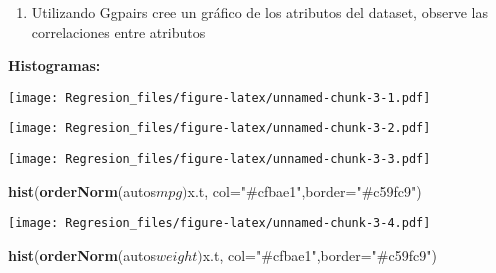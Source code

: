 \documentclass[]{article}
\newenvironment{Shaded}{\begin{snugshade}}{\end{snugshade}}
\newcommand{\KeywordTok}[1]{\textcolor[rgb]{0.13,0.29,0.53}{\textbf{{#1}}}}
\newcommand{\DataTypeTok}[1]{\textcolor[rgb]{0.13,0.29,0.53}{{#1}}}
\newcommand{\StringTok}[1]{\textcolor[rgb]{0.31,0.60,0.02}{{#1}}}
\newcommand{\NormalTok}[1]{{#1}}
\providecommand{\tightlist}{%
  \setlength{\itemsep}{0pt}\setlength{\parskip}{0pt}}
\begin{document}
\begin{enumerate}
\def\labelenumi{\arabic{enumi}.}
\setcounter{enumi}{1}
\tightlist
\item
  Utilizando Ggpairs cree un gráfico de los atributos del dataset,
  observe las correlaciones entre atributos
\end{enumerate}

 \textbf{Histogramas:}

\begin{Shaded}
\end{Shaded}

\texttt{[image: Regresion\_files/figure-latex/unnamed-chunk-3-1.pdf]}

\begin{Shaded}
\end{Shaded}

\texttt{[image: Regresion\_files/figure-latex/unnamed-chunk-3-2.pdf]}

\begin{Shaded}
\end{Shaded}

\texttt{[image: Regresion\_files/figure-latex/unnamed-chunk-3-3.pdf]}

\begin{Shaded}
\begin{Highlighting}[]
\KeywordTok{hist}\NormalTok{(}\KeywordTok{orderNorm}\NormalTok{(autos$mpg)$x.t, }\DataTypeTok{col=}\StringTok{"#cfbae1"}\NormalTok{,}\DataTypeTok{border=}\StringTok{"#c59fc9"}\NormalTok{)}
\end{Highlighting}
\end{Shaded}

\texttt{[image: Regresion\_files/figure-latex/unnamed-chunk-3-4.pdf]}

\begin{Shaded}
\begin{Highlighting}[]
\KeywordTok{hist}\NormalTok{(}\KeywordTok{orderNorm}\NormalTok{(autos$weight)$x.t, }\DataTypeTok{col=}\StringTok{"#cfbae1"}\NormalTok{,}\DataTypeTok{border=}\StringTok{"#c59fc9"}\NormalTok{)}
\end{Highlighting}
\end{Shaded}
\end{document}
